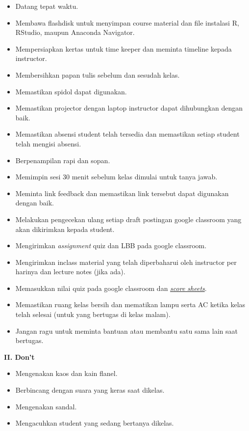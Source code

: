 \documentclass[
]{book}
\providecommand{\tightlist}{%
  \setlength{\itemsep}{0pt}\setlength{\parskip}{0pt}}
\begin{document}
\begin{itemize}
\tightlist
\item
  Datang tepat waktu.
\item
  Membawa flashdisk untuk menyimpan course material dan file instalasi R, RStudio, maupun Anaconda Navigator.
\item
  Mempersiapkan kertas untuk time keeper dan meminta timeline kepada instructor.
\item
  Membersihkan papan tulis sebelum dan sesudah kelas.
\item
  Memastikan spidol dapat digunakan.
\item
  Memastikan projector dengan laptop instructor dapat dihubungkan dengan baik.
\item
  Memastikan absensi student telah tersedia dan memastikan setiap student telah mengisi absensi.
\item
  Berpenampilan rapi dan sopan.
\item
  Memimpin sesi 30 menit sebelum kelas dimulai untuk tanya jawab.
\item
  Meminta link feedback dan memastikan link tersebut dapat digunakan dengan baik.
\item
  Melakukan pengecekan ulang setiap draft postingan google classroom yang akan dikirimkan kepada student.
\item
  Mengirimkan \emph{assignment} quiz dan LBB pada google classroom.
\item
  Mengirimkan inclass material yang telah diperbaharui oleh instructor per harinya dan lecture notes (jika ada).
\item
  Memasukkan nilai quiz pada google classroom dan \href{https://docs.google.com/spreadsheets/d/1cGJ0pn9k9gKCBnceWVwaL9D7BBDMNjLh8uPYlaBlJi8/edit\#gid=1518964141}{\emph{score sheets}}.
\item
  Memastikan ruang kelas bersih dan mematikan lampu serta AC ketika kelas telah selesai (untuk yang bertugas di kelas malam).
\item
  Jangan ragu untuk meminta bantuan atau membantu satu sama lain saat bertugas.
\end{itemize}

\textbf{II. Don't}

\begin{itemize}
\tightlist
\item
  Mengenakan kaos dan kain flanel.
\item
  Berbincang dengan suara yang keras saat dikelas.
\item
  Mengenakan sandal.
\item
  Mengacuhkan student yang sedang bertanya dikelas.
\end{itemize}
\end{document}

